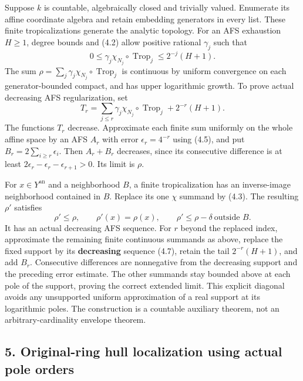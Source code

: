 \documentclass[
  10pt,
]{article}
\begin{document}
Suppose \(k\) is countable, algebraically closed and trivially valued.
Enumerate its affine coordinate algebra and retain embedding generators
in every list. These finite tropicalizations generate the analytic
topology. For an AFS exhaustion \(H\ge1\), degree bounds and (4.2) allow
positive rational \(\gamma_j\) such that
\[0\le\gamma_j\chi_{N_j}\circ\operatorname{Trop}_j\le2^{-j}(H+1).\] The
sum \(\rho=\sum_j\gamma_j\chi_{N_j}\circ\operatorname{Trop}_j\) is
continuous by uniform convergence on each generator-bounded compact, and
has upper logarithmic growth. To prove actual decreasing AFS
regularization, set
\[T_r=\sum_{j\le r}\gamma_j\chi_{N_j}\circ\operatorname{Trop}_j+2^{-r}(H+1).\]
The functions \(T_r\) decrease. Approximate each finite sum uniformly on
the whole affine space by an AFS \(A_r\) with error
\(\epsilon_r=4^{-r}\) using (4.5), and put
\(B_r=2\sum_{i\ge r}\epsilon_i\). Then \(A_r+B_r\) decreases, since its
consecutive difference is at least
\(2\epsilon_r-\epsilon_r-\epsilon_{r+1}>0\). Its limit is \(\rho\).

For \(x\in Y^{\mathrm{an}}\) and a neighborhood \(B\), a finite
tropicalization has an inverse-image neighborhood contained in \(B\).
Replace its one \(\chi\) summand by (4.3). The resulting \(\rho'\)
satisfies \[\rho'\le\rho,\qquad \rho'(x)=\rho(x),\qquad
 \rho'\le\rho-\delta\ \text{outside }B. \tag{4.8}\] It has an actual
decreasing AFS sequence. For \(r\) beyond the replaced index,
approximate the remaining finite continuous summands as above, replace
the fixed support by its \textbf{decreasing} sequence (4.7), retain the
tail \(2^{-r}(H+1)\), and add \(B_r\). Consecutive differences are
nonnegative from the decreasing support and the preceding error
estimate. The other summands stay bounded above at each pole of the
support, proving the correct extended limit. This explicit diagonal
avoids any unsupported uniform approximation of a real support at its
logarithmic poles. The construction is a countable auxiliary theorem,
not an arbitrary-cardinality envelope theorem.

\subsection{5. Original-ring hull localization using actual pole
orders}\label{original-ring-hull-localization-using-actual-pole-orders}
\end{document}
